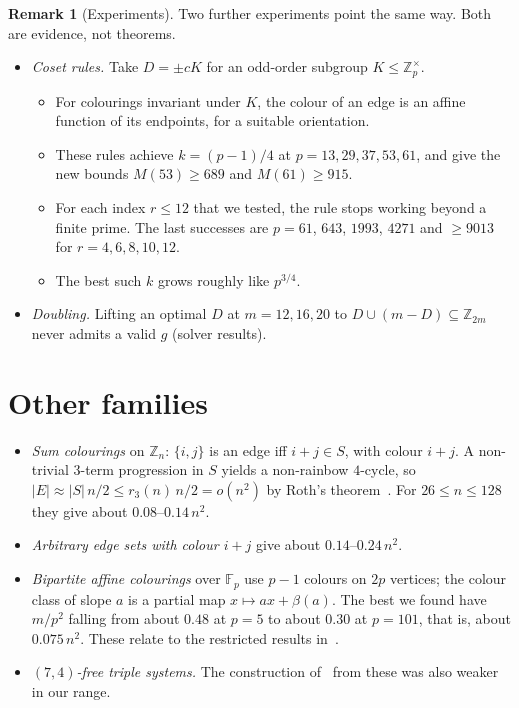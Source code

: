 \documentclass[11pt]{amsart}
\theoremstyle{definition}
\newtheorem{remark}[theorem]{Remark}
\newcommand{\Z}{\mathbb{Z}}
\newcommand{\M}{M}
\begin{document}
\begin{remark}[Experiments]
Two further experiments point the same way. Both are evidence, not theorems.
\begin{itemize}
\item \emph{Coset rules.} Take $D=\pm cK$ for an odd-order subgroup $K\le\Z_p^\times$.
  \begin{itemize}
  \item For colourings invariant under $K$, the colour of an edge is an affine function of
    its endpoints, for a suitable orientation.
  \item These rules achieve $k=(p-1)/4$ at $p=13,29,37,53,61$, and give the new bounds
    $\M(53)\ge689$ and $\M(61)\ge915$.
  \item For each index $r\le 12$ that we tested, the rule stops working beyond a finite prime.
    The last successes are $p=61$, $643$, $1993$, $4271$ and $\ge9013$ for $r=4,6,8,10,12$.
  \item The best such $k$ grows roughly like $p^{3/4}$.
  \end{itemize}
\item \emph{Doubling.} Lifting an optimal $D$ at $m=12,16,20$ to
  $D\cup(m-D)\subseteq\Z_{2m}$ never admits a valid $g$ (solver results).
\end{itemize}
\end{remark}

\section{Other families}

\begin{itemize}
\item \emph{Sum colourings} on $\Z_n$: $\{i,j\}$ is an edge iff $i+j\in S$, with colour $i+j$.
  A non-trivial $3$-term progression in $S$ yields a non-rainbow $4$-cycle, so
  $|E|\approx |S|\,n/2\le r_3(n)\,n/2=o(n^2)$ by Roth's theorem~\cite{Roth53}. For
  $26\le n\le128$ they give about $0.08$--$0.14\,n^2$.
\item \emph{Arbitrary edge sets with colour $i+j$} give about $0.14$--$0.24\,n^2$.
\item \emph{Bipartite affine colourings} over $\mathbb F_p$ use $p-1$ colours on $2p$
  vertices; the colour class of slope $a$ is a partial map $x\mapsto ax+\beta(a)$. The best we
  found have $m/p^2$ falling from about $0.48$ at $p=5$ to about $0.30$ at $p=101$, that is,
  about $0.075\,n^2$. These relate to the restricted results in~\cite{Repo}.
\item \emph{$(7,4)$-free triple systems.} The construction of~\cite{BEGS89} from these was
  also weaker in our range.
\end{itemize}
\end{document}

